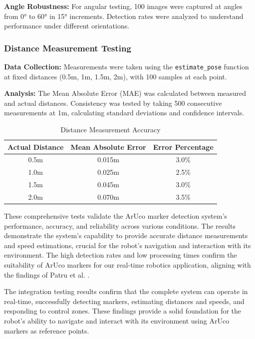 \textbf{Angle Robustness:} 
For angular testing, 100 images were captured at angles from 0° to 60° in 15° increments. Detection rates were analyzed to understand performance under different orientations.



\subsubsection{Distance Measurement Testing}
\textbf{Data Collection:} 
Measurements were taken using the \texttt{estimate\_pose} function at fixed distances (0.5m, 1m, 1.5m, 2m), with 100 samples at each point.

\textbf{Analysis:} 
The Mean Absolute Error (MAE) was calculated between measured and actual distances. Consistency was tested by taking 500 consecutive measurements at 1m, calculating standard deviations and confidence intervals.

\begin{table}[H]
	\centering
	\caption{Distance Measurement Accuracy}
	\label{tab:distance_accuracy}
	\begin{tabular}{ccc}
		\hline
		\textbf{Actual Distance} & \textbf{Mean Absolute Error} & \textbf{Error Percentage} \\
		\hline
		0.5m & 0.015m & 3.0\% \\
		1.0m & 0.025m & 2.5\% \\
		1.5m & 0.045m & 3.0\% \\
		2.0m & 0.070m & 3.5\% \\
		\hline
	\end{tabular}
\end{table}


These comprehensive tests validate the ArUco marker detection system's performance, accuracy, and reliability across various conditions. The results demonstrate the system's capability to provide accurate distance measurements and speed estimations, crucial for the robot's navigation and interaction with its environment. The high detection rates and low processing times confirm the suitability of ArUco markers for our real-time robotics application, aligning with the findings of Patru et al. \cite{patru2023empirical}.

The integration testing results confirm that the complete system can operate in real-time, successfully detecting markers, estimating distances and speeds, and responding to control zones. These findings provide a solid foundation for the robot's ability to navigate and interact with its environment using ArUco markers as reference points.





